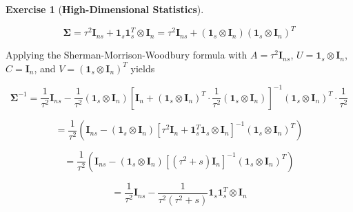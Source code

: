 \documentclass{article}
\theoremstyle{definition}
\newtheorem{exercise}{Exercise}
\theoremstyle{definition}
\newtheorem{theorem}{Theorem}
\theoremstyle{definition}
\theoremstyle{definition}
\theoremstyle{definition}
\begin{document}
\begin{exercise}[\textbf{High-Dimensional Statistics}]
\begin{enumerate}[(a)]
\[
\boldsymbol{\Sigma} = \tau^2 \boldsymbol{I}_{ns} + \boldsymbol{1}_s\boldsymbol{1}_s^T \otimes \boldsymbol{I}_n =  \tau^2 \boldsymbol{I}_{ns} + \left(\boldsymbol{1}_s \otimes \boldsymbol{I}_n\right)\left(\boldsymbol{1}_s \otimes \boldsymbol{I}_n\right)^T
\]

Applying the Sherman-Morrison-Woodbury formula  with \(A = \tau^2 \boldsymbol{I}_{ns}\), \(U = \boldsymbol{1}_s \otimes \boldsymbol{I}_n\), \(C = \boldsymbol{I}_n \), and \(V = (\boldsymbol{1}_s \otimes \boldsymbol{I}_n) ^T\) yields

%
%

\[
\boldsymbol{\Sigma}^{-1} = \frac{1}{\tau^2} \boldsymbol{I}_{ns} - \frac{1}{\tau^2} (\boldsymbol{1}_s \otimes \boldsymbol{I}_n) \left[ \boldsymbol{I}_n + (\boldsymbol{1}_s \otimes \boldsymbol{I}_n)^T \cdot \frac{1}{\tau^2} (\boldsymbol{1}_s \otimes \boldsymbol{I}_n) \right]^{-1}(\boldsymbol{1}_s \otimes \boldsymbol{I}_n)^T \cdot \frac{1}{\tau^2}
\] 

\[
= \frac{1}{\tau^2} \left( \boldsymbol{I}_{ns} - \left(\boldsymbol{1}_s \otimes \boldsymbol{I}_n\right) \left[ \tau^2 \boldsymbol{I}_n + \boldsymbol{1}_s^T\boldsymbol{1}_s \otimes \boldsymbol{I}_n \right]^{-1}\left(\boldsymbol{1}_s \otimes \boldsymbol{I}_n\right)^T \right)
\]

\[
= \frac{1}{\tau^2} \left( \boldsymbol{I}_{ns} - \left(\boldsymbol{1}_s \otimes \boldsymbol{I}_n\right) \left[ (\tau^2 + s)  \boldsymbol{I}_n \right]^{-1}\left(\boldsymbol{1}_s \otimes \boldsymbol{I}_n\right)^T \right)
\]

\[
= \frac{1}{\tau^2} \boldsymbol{I}_{ns} - \frac{1}{\tau^2(\tau^2 + s)} \boldsymbol{1}_s \boldsymbol{1}_s^T\otimes \boldsymbol{I}_n 
\]


\end{enumerate}
\end{exercise}
\end{document}
